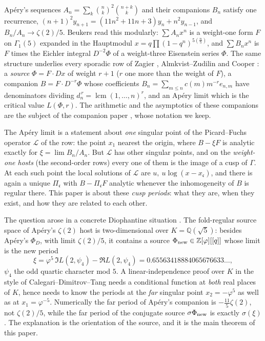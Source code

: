 \documentclass[11pt]{amsart}
\theoremstyle{definition}
\theoremstyle{remark}
\newcommand{\Q}{\mathbb Q}\newcommand{\Z}{\mathbb Z}\newcommand{\R}{\mathbb R}\newcommand{\C}{\mathbb C}\newcommand{\HH}{\mathbb H}
\DeclareMathOperator{\lcmop}{lcm}\DeclareMathOperator{\ord}{ord}\DeclareMathOperator{\Res}{Res}\DeclareMathOperator{\Gal}{Gal}
\newcommand{\cc}{\mathfrak c}\newcommand{\Pc}{\Pi_{\cc}}\newcommand{\Pq}{\Pi^{q}}
\newcommand{\Phinew}{\Phi_{\rm new}}\newcommand{\Phican}{\Phi_{\rm can}}
\begin{document}
Ap\'ery's sequences $A_n=\sum_k\binom nk^2\binom{n+k}k$ and their companions $B_n$ satisfy one recurrence, $(n+1)^2y_{n+1}=(11n^2+11n+3)y_n+n^2y_{n-1}$, and $B_n/A_n\to\zeta(2)/5$. Beukers \cite{Beukers1987} read this modularly: $\sum A_nx^n$ is a weight-one form $F$ on $\Gamma_1(5)$ expanded in the Hauptmodul $x=q\prod(1-q^n)^{5(\frac n5)}$, and $\sum B_nx^n$ is $F$ times the Eichler integral $D^{-2}\Phi$ of a weight-three Eisenstein series $\Phi$. The same structure underlies every sporadic row of Zagier \cite{Zagier}, Almkvist--Zudilin \cite{AZ} and Cooper \cite{Cooper}: a \emph{source} $\Phi=F\cdot Dx$ of weight $r+1$ ($r$ one more than the weight of $F$), a companion $B=F\cdot D^{-r}\Phi$ whose coefficients $B_n=\sum_{m\le n}c(m)m^{-r}e_{n,m}$ have denominators dividing $d_n^{\,r}=\lcmop(1,\dots,n)^r$, and an Ap\'ery limit which is the critical value $L(\Phi,r)$. The arithmetic and the asymptotics of these companions are the subject of the companion paper \cite{Companions}, whose notation we keep.

The Ap\'ery limit is a statement about \emph{one} singular point of the Picard--Fuchs operator $\mathcal L$ of the row: the point $x_1$ nearest the origin, where $B-\xi F$ is analytic exactly for $\xi=\lim B_n/A_n$. But $\mathcal L$ has other singular points, and on the \emph{weight-one hosts} (the second-order rows) every one of them is the image of a cusp of $\Gamma$. At each such point the local solutions of $\mathcal L$ are $u,\ u\log(x-x_{\cc})$, and there is again a unique $\Pc$ with $B-\Pc F$ analytic whenever the inhomogeneity of $B$ is regular there. This paper is about these \emph{cusp periods}: what they are, when they exist, and how they are related to each other.

The question arose in a concrete Diophantine situation \cite[\S5]{Companions}. The fold-regular source space of Ap\'ery's $\zeta(2)$ host is two-dimensional over $K=\Q(\sqrt5)$: besides Ap\'ery's $\Phi_D$, with limit $\zeta(2)/5$, it contains a source $\Phinew\in\Z[\varphi][[q]]$ whose limit is the new period
$$\xi=\varphi^5\,\Im L(2,\psi_4)-\Re L(2,\psi_4)=0.65563418884065676633\ldots,$$
$\psi_4$ the odd quartic character mod $5$. A linear-independence proof over $K$ in the style of Calegari--Dimitrov--Tang \cite{CDT} needs a conditional function at \emph{both} real places of $K$, hence needs to know the periods at the \emph{far} singular point $x_2=-\varphi^5$ as well as at $x_1=\varphi^{-5}$. Numerically the far period of Ap\'ery's companion is $-\tfrac{11}5\zeta(2)$, not $\zeta(2)/5$, while the far period of the conjugate source $\sigma\Phinew$ is exactly $\sigma(\xi)$. The explanation is the orientation of the source, and it is the main theorem of this paper.
\end{document}
